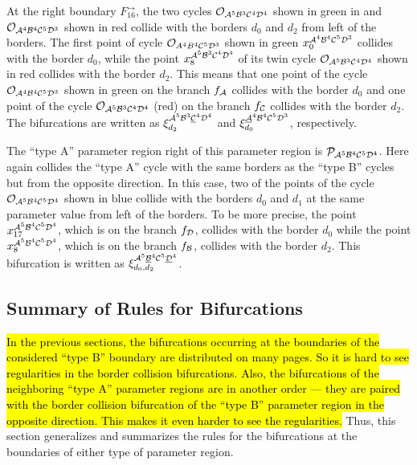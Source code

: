 At the right boundary $F_{16}^\rightarrow$, the two cycles $\mathcal{O}_{\mathcal{A}^5\mathcal{B}^3\mathcal{C}^4\mathcal{D}^4}$ shown in green in  and $\mathcal{O}_{\mathcal{A}^4\mathcal{B}^4\mathcal{C}^5\mathcal{D}^3}$ shown in red collide with the borders $d_0$ and $d_2$ from left of the borders.
The first point of cycle $\mathcal{O}_{A^4B^4\mathcal{C}^5\mathcal{D}^3}$ shown in green $x_{0}^{\mathcal{A}^4\mathcal{B}^4\mathcal{C}^5\mathcal{D}^3}$ collides with the border $d_0$, while the point $x_{8}^{\mathcal{A}^5\mathcal{B}^3\mathcal{C}^4\mathcal{D}^4}$ of its twin cycle $\mathcal{O}_{\mathcal{A}^5\mathcal{B}^3\mathcal{C}^4\mathcal{D}^4}$ shown in red collides with the border $d_2$.
This means that one point of the cycle $\mathcal{O}_{\mathcal{A}^4\mathcal{B}^4\mathcal{C}^5\mathcal{D}^3}$ shown in green on the branch $f_{\mathcal{A}}$ collides with the border $d_0$ and one point of the cycle $\mathcal{O}_{\mathcal{A}^5\mathcal{B}^3\mathcal{C}^4\mathcal{D}^4}$ (red) on the branch $f_{\mathcal{C}}$ collides with the border $d_2$.
The bifurcations are written as $\xi_{d_2}^{\mathcal{A}^5\mathcal{B}^3\underline{\mathcal{C}}^4\mathcal{D}^4}$ and $\xi_{d_0}^{\underline{\mathcal{A}}^4\mathcal{B}^4\mathcal{C}^5\mathcal{D}^3}$, respectively.

The ``type A'' parameter region right of this parameter region is $\mathcal{P}_{\mathcal{A}^5\mathcal{B}^4\mathcal{C}^5\mathcal{D}^4}$.
Here again collides the ``type A'' cycle with the same borders as the ``type B'' cycles but from the opposite direction.
In this case, two of the points of the cycle $\mathcal{O}_{\mathcal{A}^5\mathcal{B}^4\mathcal{C}^5\mathcal{D}^4}$ shown in blue collide with the borders $d_0$ and $d_1$ at the same parameter value from left of the borders.
To be more precise, the point $x_{17}^{\mathcal{A}^5\mathcal{B}^4\mathcal{C}^5\mathcal{D}^4}$, which is on the branch $f_{\mathcal{D}}$, collides with the border $d_0$ while the point $x_{8}^{\mathcal{A}^5\mathcal{B}^4\mathcal{C}^5\mathcal{D}^4}$, which is on the branch $f_{\mathcal{B}}$, collides with the border $d_2$.
This bifurcation is written as $\xi_{d_0, d_2}^{\mathcal{A}^5\underline{\mathcal{B}}^4\mathcal{C}^5\underline{\mathcal{D}}^4}$.

\subsection{Summary of Rules for Bifurcations}
\label{sec:arch.bif.sum}


\hl{
	In the previous sections, the bifurcations occurring at the boundaries of the considered ``type B'' boundary are distributed on many pages.
	So it is hard to see regularities in the border collision bifurcations.
	Also, the bifurcations of the neighboring ``type A'' parameter regions are in another order --- they are paired with the border collision bifurcation of the ``type B'' parameter region in the opposite direction.
	This makes it even harder to see the regularities.
}
Thus, this section generalizes and summarizes the rules for the bifurcations at the boundaries of either type of parameter region.

